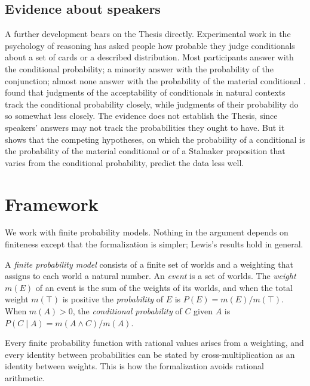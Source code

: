 \documentclass{situationist-preprint}
\begin{document}
\subsection{Evidence about speakers}

A further development bears on the Thesis directly. Experimental work in the psychology of reasoning has asked people how probable they judge conditionals about a set of cards or a described distribution. Most participants answer with the conditional probability; a minority answer with the probability of the conjunction; almost none answer with the probability of the material conditional \citep{EvansHandleyOver2003}. \citet{DouvenVerbrugge2010} found that judgments of the acceptability of conditionals in natural contexts track the conditional probability closely, while judgments of their probability do so somewhat less closely. The evidence does not establish the Thesis, since speakers' answers may not track the probabilities they ought to have. But it shows that the competing hypotheses, on which the probability of a conditional is the probability of the material conditional or of a Stalnaker proposition that varies from the conditional probability, predict the data less well.

\section{Framework}\label{s:frame}

We work with finite probability models. Nothing in the argument depends on finiteness except that the formalization is simpler; Lewis's results hold in general.

\begin{definition}\label{d:model}
A \emph{finite probability model} consists of a finite set of worlds and a weighting that assigns to each world a natural number. An \emph{event} is a set of worlds. The \emph{weight} $m(E)$ of an event is the sum of the weights of its worlds, and when the total weight $m(\top)$ is positive the \emph{probability} of $E$ is $P(E) = m(E)/m(\top)$. When $m(A) > 0$, the \emph{conditional probability} of $C$ given $A$ is $P(C \mid A) = m(A \wedge C)/m(A)$.
\end{definition}

Every finite probability function with rational values arises from a weighting, and every identity between probabilities can be stated by cross-multiplication as an identity between weights. This is how the formalization avoids rational arithmetic.
\end{document}
